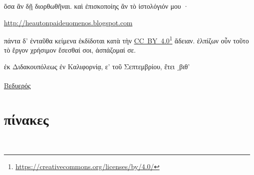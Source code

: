 \documentclass{book}
\begin{document}
ὅσα ἂν δῇ διορθωθῆναι.
καὶ ἐπισκοποίης ἂν τὸ ἰστολόγιόν μου ·
\begin{flushleft}
\url{http://heautonpaideuomenos.blogspot.com}
\end{flushleft}
πάντα δ' ἐνταῦθα κείμενα ἐκδίδοται κατὰ τὴν
\href{https://creativecommons.org/licenses/by/4.0/}{CC~BY~4.0}\footnote{\url{https://creativecommons.org/licenses/by/4.0/}} ἄδειαν.
ἐλπίζων οὖν τοῦτο τὸ ἔργον χρήσιμον ἔσεσθαί σοι, ἀσπάζομαί σε.
\begin{flushright}
ἐκ Διδακουπόλεως ἐν Καλιφορνίᾳ, ε' τοῦ Σεπτεμβρίου, ἔτει ͵βιθ' \\
~\\
\href{mailto:bedwere@yahoo.com}{Βεδυερός} \\
\end{flushright}
\chapter*{πίνακες}
\thispagestyle{empty}
~\ \newpage
~\ \newpage
\pagestyle{fancy}
\fancyhead[RE,LO]{}
\renewcommand{\headrulewidth}{0pt}
\setcounter{page}{1} \raggedright
\end{document}
